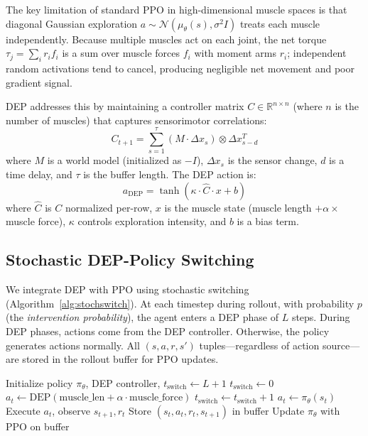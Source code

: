 \documentclass[10pt,twocolumn]{article}
\begin{document}
The key limitation of standard PPO in high-dimensional muscle spaces is that diagonal Gaussian exploration $a \sim \mathcal{N}(\mu_\theta(s), \sigma^2 I)$ treats each muscle independently. Because multiple muscles act on each joint, the net torque $\tau_j = \sum_i r_i f_i$ is a sum over muscle forces $f_i$ with moment arms $r_i$; independent random activations tend to cancel, producing negligible net movement and poor gradient signal.

DEP addresses this by maintaining a controller matrix $C \in \mathbb{R}^{n \times n}$ (where $n$ is the number of muscles) that captures sensorimotor correlations:
\begin{equation}
C_{t+1} = \sum_{s=1}^{\tau} (M \cdot \Delta x_s) \otimes \Delta x_{s-d}^T
\end{equation}
where $M$ is a world model (initialized as $-I$), $\Delta x_s$ is the sensor change, $d$ is a time delay, and $\tau$ is the buffer length. The DEP action is:
\begin{equation}
a_\text{DEP} = \tanh(\kappa \cdot \hat{C} \cdot x + b)
\end{equation}
where $\hat{C}$ is $C$ normalized per-row, $x$ is the muscle state (muscle length $+ \alpha \times$ muscle force), $\kappa$ controls exploration intensity, and $b$ is a bias term.

\subsection{Stochastic DEP-Policy Switching}

We integrate DEP with PPO using stochastic switching (Algorithm~\ref{alg:stochswitch}). At each timestep during rollout, with probability $p$ (the \textit{intervention probability}), the agent enters a DEP phase of $L$ steps. During DEP phases, actions come from the DEP controller. Otherwise, the policy generates actions normally. All $(s, a, r, s')$ tuples---regardless of action source---are stored in the rollout buffer for PPO updates.

\begin{algorithm}[h]
\caption{StochSwitchDep Rollout}
\label{alg:stochswitch}
\begin{algorithmic}[1]
\State Initialize policy $\pi_\theta$, DEP controller, $t_\text{switch} \gets L+1$
            \State $t_\text{switch} \gets 0$
        \EndIf
    \EndIf
        \State $a_t \gets \text{DEP}(\text{muscle\_len} + \alpha \cdot \text{muscle\_force})$
        \State $t_\text{switch} \gets t_\text{switch} + 1$
    \Else
        \State $a_t \gets \pi_\theta(s_t)$
    \EndIf
    \State Execute $a_t$, observe $s_{t+1}, r_t$
    \State Store $(s_t, a_t, r_t, s_{t+1})$ in buffer
\EndFor
\State Update $\pi_\theta$ with PPO on buffer
\end{algorithmic}
\end{algorithm}
\end{document}

